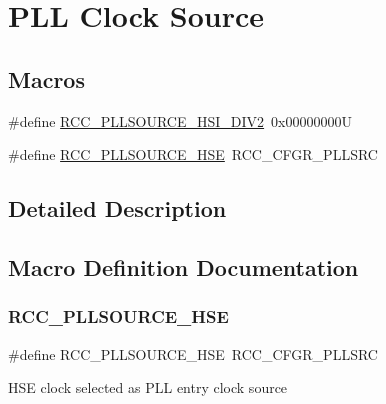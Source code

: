 \hypertarget{group___r_c_c___p_l_l___clock___source}{}\section{P\+LL Clock Source}
\label{group___r_c_c___p_l_l___clock___source}
\subsection*{Macros}
\begin{DoxyCompactItemize}
\item 
\#define \hyperlink{group___r_c_c___p_l_l___clock___source_ga09fff12a4e92f4da5980321b7f99b632}{R\+C\+C\+\_\+\+P\+L\+L\+S\+O\+U\+R\+C\+E\+\_\+\+H\+S\+I\+\_\+\+D\+I\+V2}~0x00000000U
\item 
\#define \hyperlink{group___r_c_c___p_l_l___clock___source_ga197cea7fe5c2db26fe7fcdb0f99dd4d7}{R\+C\+C\+\_\+\+P\+L\+L\+S\+O\+U\+R\+C\+E\+\_\+\+H\+SE}~R\+C\+C\+\_\+\+C\+F\+G\+R\+\_\+\+P\+L\+L\+S\+RC
\end{DoxyCompactItemize}


\subsection{Detailed Description}


\subsection{Macro Definition Documentation}
\mbox{\label{group___r_c_c___p_l_l___clock___source_ga197cea7fe5c2db26fe7fcdb0f99dd4d7}} 
\subsubsection{\texorpdfstring{R\+C\+C\+\_\+\+P\+L\+L\+S\+O\+U\+R\+C\+E\+\_\+\+H\+SE}{RCC\_PLLSOURCE\_HSE}}
{\footnotesize\ttfamily \#define R\+C\+C\+\_\+\+P\+L\+L\+S\+O\+U\+R\+C\+E\+\_\+\+H\+SE~R\+C\+C\+\_\+\+C\+F\+G\+R\+\_\+\+P\+L\+L\+S\+RC}

H\+SE clock selected as P\+LL entry clock source 

